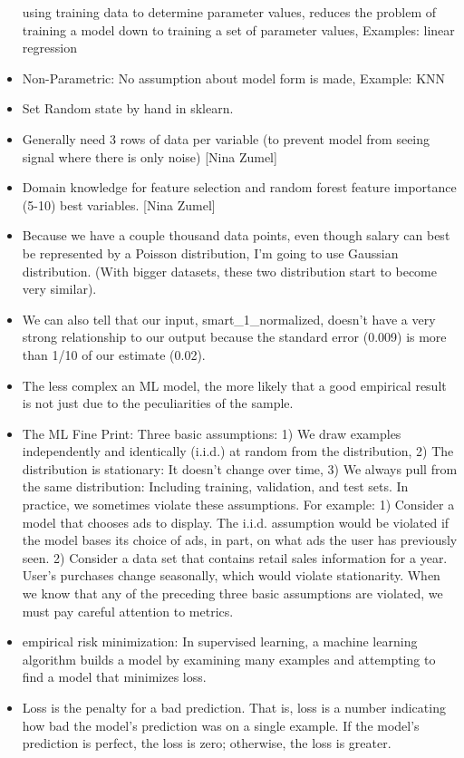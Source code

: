 \documentclass[]{book}
\theoremstyle{definition}
\theoremstyle{definition}
\theoremstyle{definition}
\theoremstyle{remark}
\begin{document}
\begin{itemize}
  using training data to determine parameter values, reduces the problem
  of training a model down to training a set of parameter values,
  Examples: linear regression
\item
  Non-Parametric: No assumption about model form is made, Example: KNN
\item
  Set Random state by hand in sklearn.
\item
  Generally need 3 rows of data per variable (to prevent model from
  seeing signal where there is only noise) {[}Nina Zumel{]}
\item
  Domain knowledge for feature selection and random forest feature
  importance (5-10) best variables. {[}Nina Zumel{]}
\item
  Because we have a couple thousand data points, even though salary can
  best be represented by a Poisson distribution, I'm going to use
  Gaussian distribution. (With bigger datasets, these two distribution
  start to become very similar).
\item
  We can also tell that our input, smart\_1\_normalized, doesn't have a
  very strong relationship to our output because the standard error
  (0.009) is more than 1/10 of our estimate (0.02).
\item
  The less complex an ML model, the more likely that a good empirical
  result is not just due to the peculiarities of the sample.
\item
  The ML Fine Print: Three basic assumptions: 1) We draw examples
  independently and identically (i.i.d.) at random from the
  distribution, 2) The distribution is stationary: It doesn't change
  over time, 3) We always pull from the same distribution: Including
  training, validation, and test sets. In practice, we sometimes violate
  these assumptions. For example: 1) Consider a model that chooses ads
  to display. The i.i.d. assumption would be violated if the model bases
  its choice of ads, in part, on what ads the user has previously seen.
  2) Consider a data set that contains retail sales information for a
  year. User's purchases change seasonally, which would violate
  stationarity. When we know that any of the preceding three basic
  assumptions are violated, we must pay careful attention to metrics.
\item
  empirical risk minimization: In supervised learning, a machine
  learning algorithm builds a model by examining many examples and
  attempting to find a model that minimizes loss.
\item
  Loss is the penalty for a bad prediction. That is, loss is a number
  indicating how bad the model's prediction was on a single example. If
  the model's prediction is perfect, the loss is zero; otherwise, the
  loss is greater.
\end{itemize}
\end{document}

